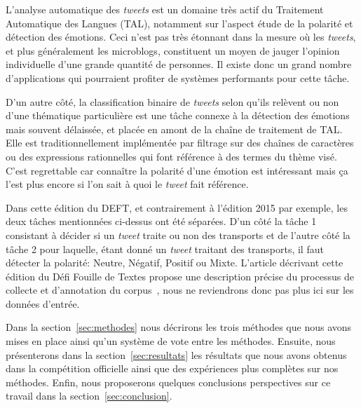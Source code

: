 
L'analyse automatique des \textit{tweets} est un domaine très actif du Traitement Automatique des Langues (TAL), notamment sur l'aspect étude de la polarité et détection des émotions.
Ceci n'est pas très étonnant dans la mesure où les \textit{tweets}, et plus généralement les microblogs, constituent un moyen de jauger l'opinion individuelle d'une grande quantité de personnes.
Il existe donc un grand nombre d'applications qui pourraient profiter de systèmes performants pour cette tâche.

D'un autre côté, la classification binaire de \textit{tweets} selon qu'ils relèvent ou non d'une thématique particulière est une tâche connexe à la détection des émotions mais souvent délaissée, et placée en amont de la chaîne de traitement de {TAL}.
Elle est traditionnellement implémentée par filtrage sur des chaînes de caractères ou des expressions rationnelles qui font référence à des termes du thème visé.
C'est regrettable car connaître la polarité d'une émotion est intéressant mais ça l'est plus encore si l'on sait à quoi le \textit{tweet} fait référence.

Dans cette édition du DEFT, et contrairement à l'édition 2015 par exemple, les deux tâches mentionnées ci-dessus  ont été séparées.
D'un côté la tâche 1 consistant à décider si un \textit{tweet} traite ou non des transports et de l'autre côté la tâche 2 pour laquelle, étant donné un \textit{tweet} traitant des transports, il faut détecter la polarité: Neutre, Négatif, Positif ou Mixte.
L'article décrivant cette édition du Défi Fouille de Textes propose une description précise du processus de collecte et d'annotation du corpus~\cite{Paroubek-2018}, nous ne reviendrons donc pas plus ici sur les données d'entrée.

Dans la section~\ref{sec:methodes} nous décrirons les trois méthodes que nous avons mises en place ainsi qu'un système de vote entre les méthodes.
Ensuite, nous présenterons dans la section~\ref{sec:resultats} les résultats que nous avons obtenus dans la compétition officielle ainsi que des expériences plus complètes sur nos méthodes.
Enfin, nous proposerons quelques conclusions perspectives sur ce travail dans la section~\ref{sec:conclusion}.

